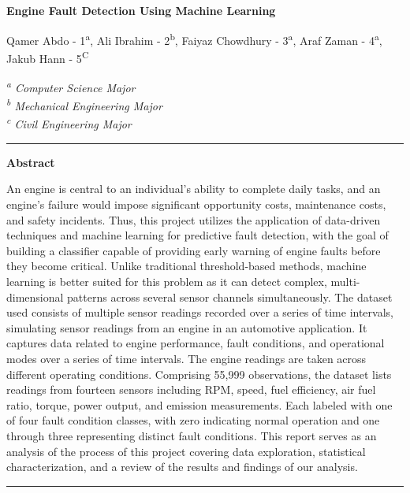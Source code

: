 \documentclass[10pt, letterpaper]{article}
\newenvironment{mabstract}
    {
        \vspace{-0.5em}
        \noindent\rule{\linewidth}{1pt} %
        \par\vspace{0.3em}
        \noindent\textbf{Abstract} %
        \par\noindent\ignorespaces
    }
    {
        \par\vspace{0.2em}
        \noindent\rule{\linewidth}{1pt} %
        \vspace{-1.5em}
    }
\begin{document}
\begin{flushleft}
    {\LARGE\bfseries 
    Engine Fault Detection Using Machine Learning
    \par}
    \vspace{1.2em}
    {
    Qamer Abdo  - 1\textsuperscript{a}, Ali Ibrahim - 2\textsuperscript{b}, Faiyaz Chowdhury - 3\textsuperscript{a}, Araf Zaman - 4\textsuperscript{a}, Jakub Hann - 5\textsuperscript{C}
    \par}
    \vspace{1em}
    {\small\itshape
    \textsuperscript{a} Computer Science Major\\
    \textsuperscript{b} Mechanical Engineering Major\\
    \textsuperscript{c} Civil Engineering Major\\
    \par}
\end{flushleft}

\begin{mabstract}
An engine is central to an individual's ability to complete daily tasks, and an engine's failure would impose significant opportunity costs, maintenance costs, and safety incidents. Thus, this project utilizes the application of data-driven techniques and machine learning for predictive fault detection, with the goal of building a classifier capable of providing early warning of engine faults before they become critical. Unlike traditional threshold-based methods, machine learning is better suited for this problem as it can detect complex, multi-dimensional patterns across several sensor channels simultaneously. The dataset used consists of multiple sensor readings recorded over a series of time intervals, simulating sensor readings from an engine in an automotive application. It captures data related to engine performance, fault conditions, and operational modes over a series of time intervals. The engine readings are taken across different operating conditions. Comprising 55,999 observations, the dataset lists readings from fourteen sensors including RPM, speed, fuel efficiency, air fuel ratio, torque, power output, and emission measurements. Each labeled with one of four fault condition classes, with zero indicating normal operation and one through three representing distinct fault conditions. This report serves as an analysis of the process of this project covering data exploration, statistical characterization, and a review of the results and findings of our analysis.
\end{mabstract}
\end{document}
